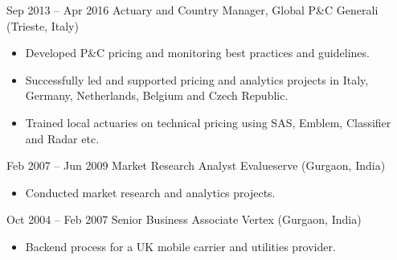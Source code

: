 \documentclass[a4paper,]{fortysecondscv}
\begin{document}
\begin{cvtable}[4]
{\begin{itemize}[nosep, leftmargin=0pt]
				\end{itemize}
			}
		\cvitem
			{Sep 2013 -- Apr 2016}
			{Actuary and Country Manager, Global P\&C}
			{Generali (Trieste, Italy)}
			{
				\vspace{-\topsep}
				\begin{itemize}[nosep, leftmargin=0pt] %
					\item Developed P\&C pricing and monitoring best practices and guidelines.
					\item Successfully led and supported pricing and analytics projects in Italy, Germany, Netherlands, Belgium and Czech Republic.
					\item Trained local actuaries on technical pricing using SAS, Emblem, Classifier and Radar etc.
				\end{itemize}
			}
		\cvitem
			{Feb 2007 -- Jun 2009}
			{Market Research Analyst}
			{Evalueserve (Gurgaon, India)}
			{
				\vspace{-\topsep}
				\begin{itemize}[nosep, leftmargin=0pt] %
					\item Conducted market research and analytics projects.
				\end{itemize}
			}
		\cvitem
			{Oct 2004 -- Feb 2007}
			{Senior Business Associate}
			{Vertex (Gurgaon, India)}
			{ 
				\vspace{-\topsep}
				\begin{itemize}[nosep, leftmargin=0pt] %
					\item Backend process for a UK mobile carrier and utilities provider.
				\end{itemize}
			}
	\end{cvtable}





\newpage
\makebacksidebar

\end{document}
